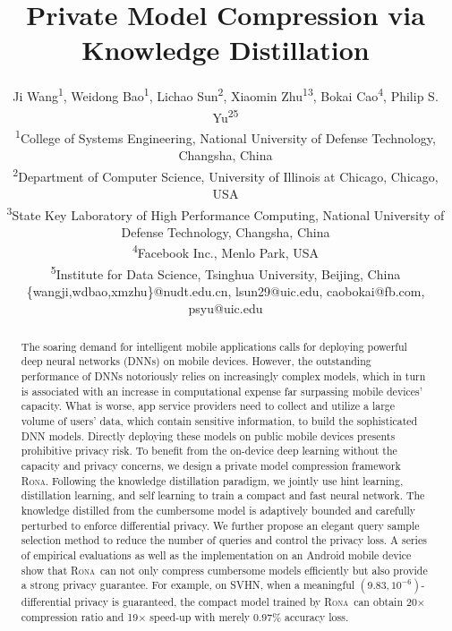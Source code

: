 \documentclass[letterpaper]{article} %
\newcommand*\system{\textsc{Rona}}
\begin{document}
\title{Private Model Compression via Knowledge Distillation}
\author{Ji Wang\textsuperscript{1}, Weidong Bao\textsuperscript{1}, Lichao Sun\textsuperscript{2}, Xiaomin Zhu\textsuperscript{1}\textsuperscript{3}, Bokai Cao\textsuperscript{4}, Philip S. Yu\textsuperscript{2}\textsuperscript{5}\\
\textsuperscript{1}{College of Systems Engineering, National University of Defense Technology, Changsha, China}\\
\textsuperscript{2}{Department of Computer Science, University of Illinois at Chicago, Chicago, USA}\\
\textsuperscript{3}{State Key Laboratory of High Performance Computing, National University of Defense Technology, Changsha, China}\\
\textsuperscript{4}{Facebook Inc., Menlo Park, USA}\\
\textsuperscript{5}{Institute for Data Science, Tsinghua University, Beijing, China}\\
\{wangji,wdbao,xmzhu\}@nudt.edu.cn,
lsun29@uic.edu,
caobokai@fb.com,
psyu@uic.edu
}
\maketitle
\begin{abstract}
The soaring demand for intelligent mobile applications calls for deploying powerful deep neural networks (DNNs) on mobile devices. However, the outstanding performance of DNNs notoriously relies on increasingly complex models, which in turn is associated with an increase in computational expense far surpassing mobile devices' capacity. What is worse, app service providers need to collect and utilize a large volume of users' data, which contain sensitive information, to build the sophisticated DNN models. Directly deploying these models on public mobile devices presents prohibitive privacy risk. To benefit from the on-device deep learning without the capacity and privacy concerns, we design a private model compression framework \system. Following the knowledge distillation paradigm, we jointly use hint learning, distillation learning, and self learning to train a compact and fast neural network. The knowledge distilled from the cumbersome model is adaptively bounded and carefully perturbed to enforce differential privacy. We further propose an elegant query sample selection method to reduce the number of queries and control the privacy loss. A series of empirical evaluations as well as the implementation on an Android mobile device show that \system\ can not only compress cumbersome models efficiently but also provide a strong privacy guarantee. For example, on SVHN, when a meaningful $(9.83,10^{-6})$-differential privacy is guaranteed, the compact model trained by \system\ can obtain 20$\times$ compression ratio and 19$\times$ speed-up with merely 0.97\% accuracy loss.
\end{abstract}
\end{document}
